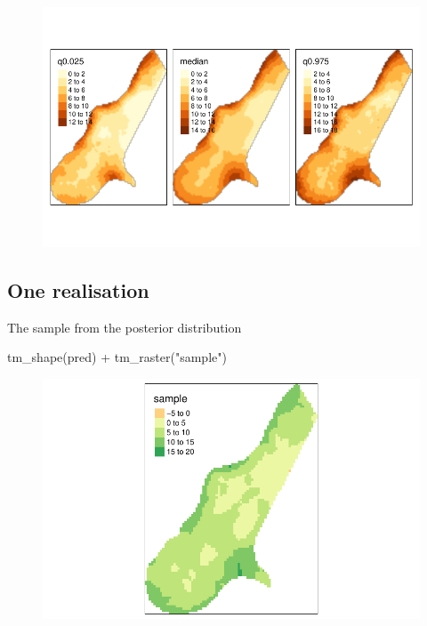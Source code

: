 \documentclass[
  a4paper,
]{article}
\newenvironment{Shaded}{\begin{snugshade}}{\end{snugshade}}
\newcommand{\FunctionTok}[1]{\textcolor[rgb]{0.28,0.35,0.67}{#1}}
\newcommand{\NormalTok}[1]{\textcolor[rgb]{0.00,0.23,0.31}{#1}}
\newcommand{\SpecialCharTok}[1]{\textcolor[rgb]{0.37,0.37,0.37}{#1}}
\newcommand{\StringTok}[1]{\textcolor[rgb]{0.13,0.47,0.30}{#1}}
\begin{document}
\begin{figure}[H]

{\centering \includegraphics{pedometron_files/figure-pdf/unnamed-chunk-12-1.pdf}

}

\end{figure}

\hypertarget{one-realisation}{%
\subsection{One realisation}\label{one-realisation}}

The sample from the posterior distribution

\begin{Shaded}
\begin{Highlighting}[]
\FunctionTok{tm\_shape}\NormalTok{(pred) }\SpecialCharTok{+} \FunctionTok{tm\_raster}\NormalTok{(}\StringTok{"sample"}\NormalTok{)}
\end{Highlighting}
\end{Shaded}

\begin{figure}[H]

{\centering \includegraphics{pedometron_files/figure-pdf/unnamed-chunk-13-1.pdf}

}

\end{figure}
\end{document}
